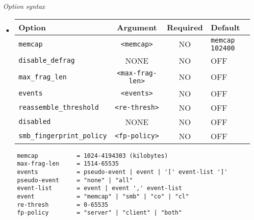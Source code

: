 \documentclass[english]{report}
\begin{document}
\textit{Option syntax}
\begin{itemize}

\item[]
\begin{tabular}{|l|c|c|p{6cm}|}
\hline
Option & Argument & Required & Default\\
\hline
\hline
\texttt{memcap} & \texttt{<memcap>} & NO & \texttt{memcap 102400}\\
\hline
\texttt{disable\_defrag} & NONE & NO & OFF\\
\hline
\texttt{max\_frag\_len} & \texttt{<max-frag-len>} & NO & OFF\\
\hline
\texttt{events} & \texttt{<events>} & NO & OFF\\
\hline
\texttt{reassemble\_threshold} & \texttt{<re-thresh>} & NO & OFF\\
\hline
\texttt{disabled} & NONE & NO & OFF\\
\hline
\texttt{smb\_fingerprint\_policy} & \texttt{<fp-policy>} & NO & OFF\\
\hline
\end{tabular}
\end{itemize}

\footnotesize
\begin{verbatim}
    memcap           = 1024-4194303 (kilobytes)
    max-frag-len     = 1514-65535
    events           = pseudo-event | event | '[' event-list ']'
    pseudo-event     = "none" | "all"
    event-list       = event | event ',' event-list
    event            = "memcap" | "smb" | "co" | "cl"
    re-thresh        = 0-65535
    fp-policy        = "server" | "client" | "both"
\end{verbatim}
\normalsize
\end{document}
